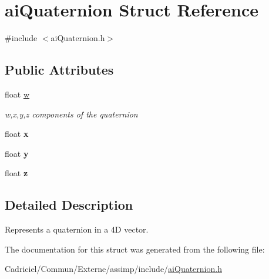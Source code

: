 \hypertarget{structai_quaternion}{\section{ai\-Quaternion Struct Reference}
\label{structai_quaternion}
}


{\ttfamily \#include $<$ai\-Quaternion.\-h$>$}

\subsection*{Public Attributes}
\begin{DoxyCompactItemize}
\item 
\hypertarget{structai_quaternion_a410b3c46417d67d728a01a5810907a36}{float \hyperlink{structai_quaternion_a410b3c46417d67d728a01a5810907a36}{w}}\label{structai_quaternion_a410b3c46417d67d728a01a5810907a36}

\begin{DoxyCompactList}\small\item\em w,x,y,z components of the quaternion \end{DoxyCompactList}\item 
\hypertarget{structai_quaternion_af9db21b086c14d8654d62005f740e75f}{float {\bfseries x}}\label{structai_quaternion_af9db21b086c14d8654d62005f740e75f}

\item 
\hypertarget{structai_quaternion_a1695fefbc60becf95fcafcc08573ab44}{float {\bfseries y}}\label{structai_quaternion_a1695fefbc60becf95fcafcc08573ab44}

\item 
\hypertarget{structai_quaternion_acc30da6103d5131fb1bed6640f1eeda0}{float {\bfseries z}}\label{structai_quaternion_acc30da6103d5131fb1bed6640f1eeda0}

\end{DoxyCompactItemize}


\subsection{Detailed Description}
Represents a quaternion in a 4\-D vector. 

The documentation for this struct was generated from the following file\-:\begin{DoxyCompactItemize}
\item 
Cadriciel/\-Commun/\-Externe/assimp/include/\hyperlink{ai_quaternion_8h}{ai\-Quaternion.\-h}\end{DoxyCompactItemize}
